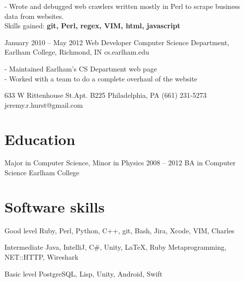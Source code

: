 \documentclass{tccv}
\begin{document}
\begin{eventlist}
- Wrote and debugged web crawlers written mostly in Perl to scrape business data from websites. \\
Skills gained: \textbf{git, Perl, regex, VIM, html, javascript}

\item{January 2010 -- May 2012}
     {Web Developer}
     {Computer Science Department, Earlham College, Richmond, IN}
     {cs.earlham.edu}

- Maintained Earlham's CS Department web page \\
- Worked with a team to do a complete overhaul of the website

\end{eventlist}

\personal
    {633 W Rittenhouse St.\newline Apt. B225 \newline Philadelphia, PA }
    {(661) 231-5273}
    {jeremy.r.hurst@gmail.com}

\section{Education}

\begin{yearlist}

\item[Major in Computer Science, Minor in Physics]{2008 -- 2012}
     {BA in Computer Science}
     {Earlham College}

\end{yearlist}

\section{Software skills}

\begin{factlist}

\item{Good level}
     {Ruby, Perl, Python, C++, git, Bash, Jira, Xcode, VIM, Charles}

\item{Intermediate}
     {Java, IntelliJ, C\#, Unity, \LaTeX, Ruby Metaprogramming, NET::HTTP, Wireshark}

\item{Basic level}
     {PostgreSQL, Lisp, Unity, Android, Swift}

\end{factlist}
\end{document}
